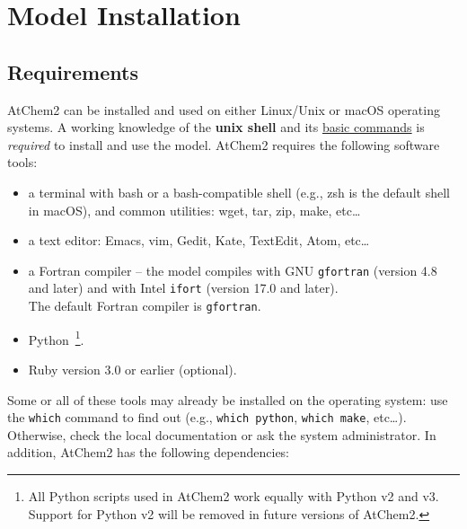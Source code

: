 %
%
%
%

\chapter{Model Installation} \label{ch:installation}

\section{Requirements} \label{sec:requirements}

AtChem2 can be installed and used on either Linux/Unix or macOS
operating systems. A working knowledge of the \textbf{unix shell} and
its \href{https://swcarpentry.github.io/shell-novice}{basic commands}
is \emph{required} to install and use the model. AtChem2 requires the
following software tools:

\begin{itemize}
\item a terminal with bash or a bash-compatible shell (e.g., zsh is
  the default shell in macOS), and common utilities: wget, tar, zip,
  make, etc\ldots
\item a text editor: Emacs, vim, Gedit, Kate, TextEdit, Atom,
  etc\ldots
\item a Fortran compiler -- the model compiles with GNU
  \texttt{gfortran} (version 4.8 and later) and with Intel
  \texttt{ifort} (version 17.0 and later).\\
  The default Fortran compiler is \texttt{gfortran}.
\item Python~\footnote{All Python scripts used in AtChem2 work equally
    with Python v2 and v3. Support for Python v2 will be removed in
    future versions of AtChem2.}.
\item Ruby version 3.0 or earlier (optional).
\end{itemize}

Some or all of these tools may already be installed on the operating
system: use the \texttt{which} command to find out (e.g.,
\verb|which python|, \verb|which make|, etc\ldots). Otherwise, check
the local documentation or ask the system administrator. In addition,
AtChem2 has the following dependencies:

